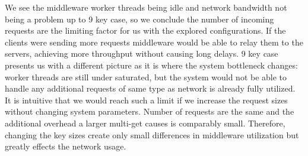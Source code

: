 \documentclass[11pt,a4paper]{article}
\begin{document}
\par We see the middleware worker threads being idle and network bandwidth not being a problem up to 9 key case, so we conclude the number of incoming requests are the limiting factor for us with the explored configurations. If the clients were sending more requests middleware would be able to relay them to the servers, achieving more throughput without causing long delays. 9 key case presents us with a different picture as it is where the system bottleneck changes: worker threads are still under saturated, but the system would not be able to handle any additional requests of same type as network is already fully utilized. It is intuitive that we would reach such a limit if we increase the request sizes without changing system parameters. Number of requests are the same and the additional overhead a larger multi-get causes is comparably small. Therefore, changing the key sizes create only small differences in middleware utilization but greatly effects the network usage.
\end{document}
